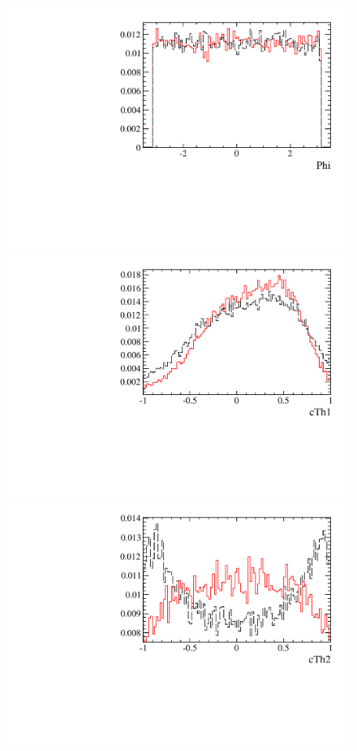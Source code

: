 \begin{figure} [htb!]
\begin{center}
\includegraphics[scale=0.20]{figs/PhiFULL.pdf}
\includegraphics[scale=0.20]{figs/cTh1FULL.pdf}
\includegraphics[scale=0.20]{figs/cTh2FULL.pdf}

\end{center}
\end{figure}

